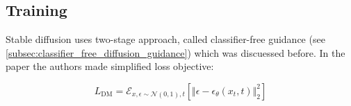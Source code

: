 \subsection{Training}

Stable diffusion uses two-stage approach, called classifier-free guidance (see \ref{subsec:classifier_free_diffusion_guidance}) which was discuessed before. In the paper the authors made simplified loss objective:

\begin{equation}
    L_{\text{DM}} = \mathcal{E}_{x, \epsilon \sim \mathcal{N} (0, 1), t} [ \Vert \epsilon - \epsilon_\theta(x_t, t) \Vert _2^2 ]

\end{equation}